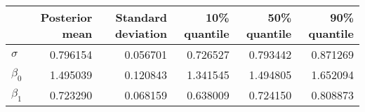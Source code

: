 \begin{tabular}{lrrrrr}
\toprule
{} &  Posterior mean &  Standard deviation &  10\% quantile &  50\% quantile &  90\% quantile \\
\midrule
$\sigma$  &        0.796154 &            0.056701 &      0.726527 &      0.793442 &      0.871269 \\
$\beta_0$ &        1.495039 &            0.120843 &      1.341545 &      1.494805 &      1.652094 \\
$\beta_1$ &        0.723290 &            0.068159 &      0.638009 &      0.724150 &      0.808873 \\
\bottomrule
\end{tabular}
